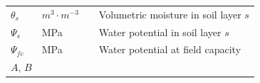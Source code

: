 \documentclass[]{book}
\begin{document}
\begin{longtable}[]{@{}llll@{}}
\begin{minipage}[t]{0.11\columnwidth}\raggedright\strut
\(\theta_s\)\strut
\end{minipage} & \begin{minipage}[t]{0.10\columnwidth}\raggedright\strut
\(m^3 \cdot m^{-3}\)\strut
\end{minipage} & \begin{minipage}[t]{0.12\columnwidth}\raggedright\strut
\strut
\end{minipage} & \begin{minipage}[t]{0.45\columnwidth}\raggedright\strut
Volumetric moisture in soil layer \(s\)\strut
\end{minipage}\tabularnewline
\begin{minipage}[t]{0.11\columnwidth}\raggedright\strut
\(\Psi_s\)\strut
\end{minipage} & \begin{minipage}[t]{0.10\columnwidth}\raggedright\strut
MPa\strut
\end{minipage} & \begin{minipage}[t]{0.12\columnwidth}\raggedright\strut
\strut
\end{minipage} & \begin{minipage}[t]{0.45\columnwidth}\raggedright\strut
Water potential in soil layer \(s\)\strut
\end{minipage}\tabularnewline
\begin{minipage}[t]{0.11\columnwidth}\raggedright\strut
\(\Psi_{fc}\)\strut
\end{minipage} & \begin{minipage}[t]{0.10\columnwidth}\raggedright\strut
MPa\strut
\end{minipage} & \begin{minipage}[t]{0.12\columnwidth}\raggedright\strut
\strut
\end{minipage} & \begin{minipage}[t]{0.45\columnwidth}\raggedright\strut
Water potential at field capacity\strut
\end{minipage}\tabularnewline
\begin{minipage}[t]{0.11\columnwidth}\raggedright\strut
\(A\), \(B\)\strut
\end{minipage} & \begin{minipage}[t]{0.10\columnwidth}\raggedright\strut
\strut
\end{minipage} & \begin{minipage}[t]{0.12\columnwidth}\raggedright\strut
\strut
\end{minipage} & \begin{minipage}[t]{0.45\columnwidth}\raggedright\strut

\end{minipage}
\end{longtable}
\end{document}

